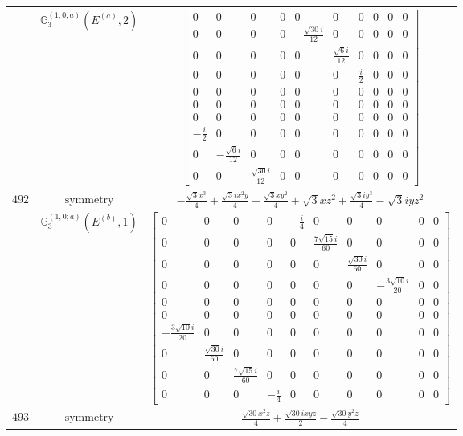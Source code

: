 \documentclass[fleqn,8pt,landscape]{jsarticle}
\begin{document}
\begin{longtable}{ccc}
$  $ & $ \mathbb{G}_{3}^{(1,0;a)}(E^{(a)},2) $ & $ \begin{bmatrix} 0 & 0 & 0 & 0 & 0 & 0 & 0 & 0 & 0 & 0 \\ 0 & 0 & 0 & 0 & - \frac{\sqrt{30} i}{12} & 0 & 0 & 0 & 0 & 0 \\ 0 & 0 & 0 & 0 & 0 & \frac{\sqrt{6} i}{12} & 0 & 0 & 0 & 0 \\ 0 & 0 & 0 & 0 & 0 & 0 & \frac{i}{2} & 0 & 0 & 0 \\ 0 & 0 & 0 & 0 & 0 & 0 & 0 & 0 & 0 & 0 \\ 0 & 0 & 0 & 0 & 0 & 0 & 0 & 0 & 0 & 0 \\ 0 & 0 & 0 & 0 & 0 & 0 & 0 & 0 & 0 & 0 \\ - \frac{i}{2} & 0 & 0 & 0 & 0 & 0 & 0 & 0 & 0 & 0 \\ 0 & - \frac{\sqrt{6} i}{12} & 0 & 0 & 0 & 0 & 0 & 0 & 0 & 0 \\ 0 & 0 & \frac{\sqrt{30} i}{12} & 0 & 0 & 0 & 0 & 0 & 0 & 0 \end{bmatrix} $ \\ \hline
$ 492 $ & $ \text{symmetry} $ & $ - \frac{\sqrt{3} x^{3}}{4} + \frac{\sqrt{3} i x^{2} y}{4} - \frac{\sqrt{3} x y^{2}}{4} + \sqrt{3} x z^{2} + \frac{\sqrt{3} i y^{3}}{4} - \sqrt{3} i y z^{2} $ \\
$  $ & $ \mathbb{G}_{3}^{(1,0;a)}(E^{(b)},1) $ & $ \begin{bmatrix} 0 & 0 & 0 & 0 & - \frac{i}{4} & 0 & 0 & 0 & 0 & 0 \\ 0 & 0 & 0 & 0 & 0 & \frac{7 \sqrt{15} i}{60} & 0 & 0 & 0 & 0 \\ 0 & 0 & 0 & 0 & 0 & 0 & \frac{\sqrt{30} i}{60} & 0 & 0 & 0 \\ 0 & 0 & 0 & 0 & 0 & 0 & 0 & - \frac{3 \sqrt{10} i}{20} & 0 & 0 \\ 0 & 0 & 0 & 0 & 0 & 0 & 0 & 0 & 0 & 0 \\ 0 & 0 & 0 & 0 & 0 & 0 & 0 & 0 & 0 & 0 \\ - \frac{3 \sqrt{10} i}{20} & 0 & 0 & 0 & 0 & 0 & 0 & 0 & 0 & 0 \\ 0 & \frac{\sqrt{30} i}{60} & 0 & 0 & 0 & 0 & 0 & 0 & 0 & 0 \\ 0 & 0 & \frac{7 \sqrt{15} i}{60} & 0 & 0 & 0 & 0 & 0 & 0 & 0 \\ 0 & 0 & 0 & - \frac{i}{4} & 0 & 0 & 0 & 0 & 0 & 0 \end{bmatrix} $ \\ \hline
$ 493 $ & $ \text{symmetry} $ & $ \frac{\sqrt{30} x^{2} z}{4} + \frac{\sqrt{30} i x y z}{2} - \frac{\sqrt{30} y^{2} z}{4} $ \\

\end{longtable}
\end{document}
